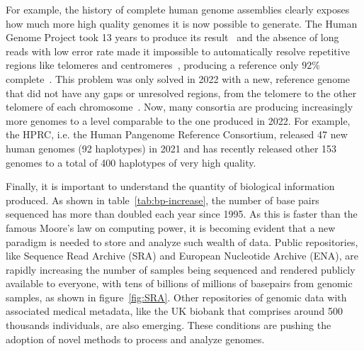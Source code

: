 
For example, the history of complete human genome assemblies clearly exposes how much more high quality genomes it is now possible to generate. The Human Genome Project took 13 years to produce its result~\cite{humangenomeproject} and the absence of long reads with low error rate made it impossible to automatically resolve repetitive regions like telomeres and centromeres~\cite{human-pangenomics-era}, producing a reference only $92\%$ complete~\cite{t2t}. This problem was only solved in 2022 with a new, reference genome that did not have any gaps or unresolved regions, from the telomere to the other telomere of each chromosome~\cite{t2t}. Now, many consortia are producing increasingly more genomes to a level comparable to the one produced in 2022. For example, the HPRC, i.e. the Human Pangenome Reference Consortium, released 47 new human genomes (92 haplotypes) in 2021 and has recently released other 153 genomes to a total of 400 haplotypes of very high quality.

Finally, it is important to understand the quantity of biological information produced. As shown in table~\ref{tab:bp-increase}, the number of base pairs sequenced has more than doubled each year since 1995. As this is faster than the famous Moore's law on computing power, it is becoming evident that a new paradigm is needed to store and analyze such wealth of data. Public repositories, like Sequence Read Archive (SRA) and European Nucleotide Archive (ENA), are rapidly increasing the number of samples being sequenced and rendered publicly available to everyone, with tens of billions of millions of basepairs from genomic samples, as shown in figure~\ref{fig:SRA}. Other repositories of genomic data with associated medical metadata, like the UK biobank that comprises around 500 thousands individuals, are also emerging. These conditions are pushing the adoption of novel methods to process and analyze genomes.

